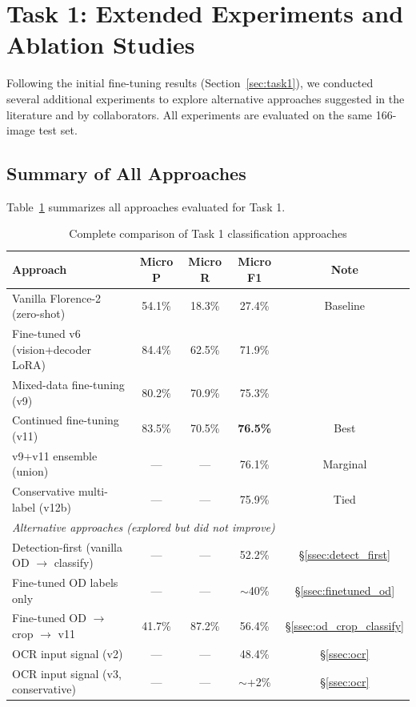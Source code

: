 \section{Task 1: Extended Experiments and Ablation Studies}
\label{sec:task1_extended}

Following the initial fine-tuning results (Section~\ref{sec:task1}), we conducted several additional experiments to explore alternative approaches suggested in the literature and by collaborators. All experiments are evaluated on the same 166-image test set.

\subsection{Summary of All Approaches}

Table~\ref{tab:all_approaches} summarizes all approaches evaluated for Task 1.

\begin{table}[h]
\centering
\caption{Complete comparison of Task 1 classification approaches}
\label{tab:all_approaches}
\small
\begin{tabular}{lcccc}
\toprule
Approach & Micro P & Micro R & Micro F1 & Note \\
\midrule
Vanilla Florence-2 (zero-shot) & 54.1\% & 18.3\% & 27.4\% & Baseline \\
Fine-tuned v6 (vision+decoder LoRA) & 84.4\% & 62.5\% & 71.9\% & \\
Mixed-data fine-tuning (v9) & 80.2\% & 70.9\% & 75.3\% & \\
Continued fine-tuning (v11) & 83.5\% & 70.5\% & \textbf{76.5\%} & Best \\
v9+v11 ensemble (union) & --- & --- & 76.1\% & Marginal \\
Conservative multi-label (v12b) & --- & --- & 75.9\% & Tied \\
\midrule
\multicolumn{5}{l}{\textit{Alternative approaches (explored but did not improve)}} \\
\midrule
Detection-first (vanilla OD $\rightarrow$ classify) & --- & --- & 52.2\% & \S\ref{ssec:detect_first} \\
Fine-tuned OD labels only & --- & --- & $\sim$40\% & \S\ref{ssec:finetuned_od} \\
Fine-tuned OD $\rightarrow$ crop $\rightarrow$ v11 & 41.7\% & 87.2\% & 56.4\% & \S\ref{ssec:od_crop_classify} \\
OCR input signal (v2) & --- & --- & 48.4\% & \S\ref{ssec:ocr} \\
OCR input signal (v3, conservative) & --- & --- & $\sim$+2\% & \S\ref{ssec:ocr} \\
\bottomrule
\end{tabular}
\end{table}


